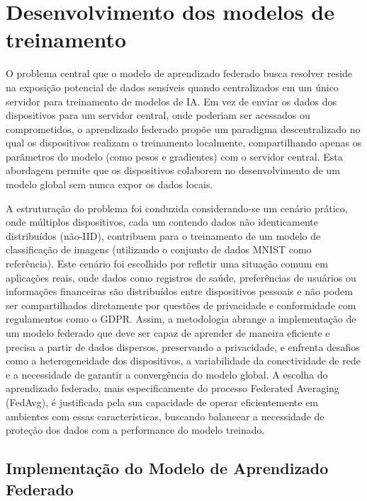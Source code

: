 \chapter[Desenvolvimento dos modelos de treinamento]{Desenvolvimento dos modelos de treinamento}
\label{chap:desenvolvimento}

O problema central que o modelo de aprendizado federado busca resolver reside na exposição potencial de dados sensíveis quando centralizados em um único servidor para treinamento de modelos de IA. Em vez de enviar os dados dos dispositivos para um servidor central, onde poderiam ser acessados ou comprometidos, o aprendizado federado propõe um paradigma descentralizado no qual os dispositivos realizam o treinamento localmente, compartilhando apenas os parâmetros do modelo (como pesos e gradientes) com o servidor central. Esta abordagem permite que os dispositivos colaborem no desenvolvimento de um modelo global sem nunca expor os dados locais. 

A estruturação do problema foi conduzida considerando-se um cenário prático, onde múltiplos dispositivos, cada um contendo dados não identicamente distribuídos (não-IID), contribuem para o treinamento de um modelo de classificação de imagens (utilizando o conjunto de dados MNIST como referência). Este cenário foi escolhido por refletir uma situação comum em aplicações reais, onde dados como registros de saúde, preferências de usuários ou informações financeiras são distribuídos entre dispositivos pessoais e não podem ser compartilhados diretamente por questões de privacidade e conformidade com regulamentos como o GDPR. Assim, a metodologia abrange a implementação de um modelo federado que deve ser capaz de aprender de maneira eficiente e precisa a partir de dados dispersos, preservando a privacidade, e enfrenta desafios como a heterogeneidade dos dispositivos, a variabilidade da conectividade de rede e a necessidade de garantir a convergência do modelo global. A escolha do aprendizado federado, mais especificamente do processo Federated Averaging (FedAvg), é justificada pela sua capacidade de operar eficientemente em ambientes com essas características, buscando balancear a necessidade de proteção dos dados com a performance do modelo treinado.

\section{Implementação do Modelo de Aprendizado Federado}


